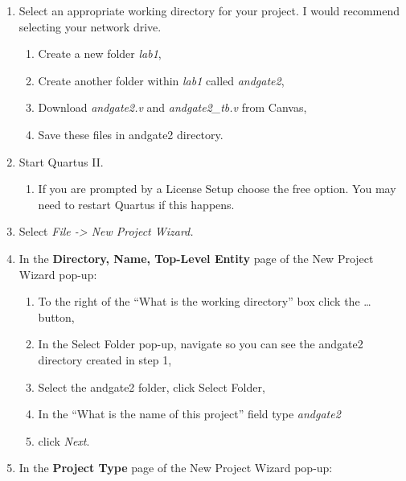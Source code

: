 \begin{enumerate}
        \def\labelenumi{\arabic{enumi}.}
    \item
        Select an appropriate working directory for your project. I would
        recommend selecting your network drive.

        \begin{enumerate}
                \def\labelenumii{\alph{enumii}.}
            \item
                Create a new folder \emph{lab1},
            \item
                Create another folder within \emph{lab1} called \emph{andgate2},
            \item
                Download \emph{andgate2.v} and \emph{andgate2\_tb.v} from Canvas,
            \item
                Save these files in andgate2 directory.
        \end{enumerate}
    \item
        Start Quartus II.

        \begin{enumerate}
                \def\labelenumii{\alph{enumii}.}
            \item
                If you are prompted by a License Setup choose the free option. You
                may need to restart Quartus if this happens.
        \end{enumerate}
    \item
        Select \emph{File -\textgreater{} New Project Wizard.}
    \item
        In the \textbf{Directory, Name, Top-Level Entity} page of the New
        Project Wizard pop-up:

        \begin{enumerate}
                \def\labelenumii{\alph{enumii}.}
            \item
                To the right of the ``What is the working directory'' box click the
                \ldots{} button,
            \item
                In the Select Folder pop-up, navigate so you can see the andgate2
                directory created in step 1,
            \item
                Select the andgate2 folder, click Select Folder,
            \item
                In the ``What is the name of this project'' field type
                \emph{andgate2}
            \item
                click \emph{Next}.
        \end{enumerate}
    \item
        In the \textbf{Project Type} page of the New Project Wizard pop-up:


\end{enumerate}

